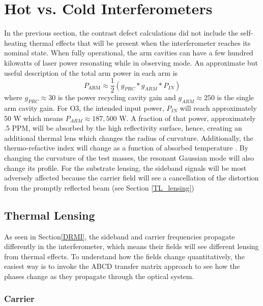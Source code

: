 	\section{Hot vs. Cold Interferometers}\label{sec:hotcoldifo}
		In the previous section, the contrast defect calculations did not include the self-heating thermal effects that will be present when the interferometer reaches its nominal state.
		When fully operational, the arm cavities can have a few hundred kilowatts of laser power resonating while in observing mode. 
		An approximate but useful description of the total arm power in each arm is
	\begin{equation}
		P_{\text{ARM}} \approx \frac{1}{2} (g_{PRC} * g_{ARM} * P_{IN})
	\end{equation}
	where $g_{PRC} \approx 30$ is the power recycling cavity gain and $g_{ARM} \approx 250$ is the single arm cavity gain.
		For O3, the intended input power, $P_{IN}$ will reach approximately 50 W which means $P_{ARM} \approx 187,500$ W. 
		A fraction of that power, approximately .5 PPM, will be absorbed by the high reflectivity surface, hence, creating an additional thermal lens which changes the radius of curvature.  
		Additionally, the thermo-refactive index will change as a function of absorbed temperature \cite{winkler_thermaldist}.
		By changing the curvature of the test masses, the resonant Gaussian mode will also change its profile.
		For the substrate lensing, the sideband signals will be most adversely affected because the carrier field will see a cancellation of the distortion from the promptly reflected beam (see Section \ref{TL_lensing})
	
	\subsection{Thermal Lensing}\label{Sec:TL_lensing}
	\cite{hiro_thermal_lens}
		As seen in Section\ref{DRMI}, the sideband and carrier frequencies propagate differently in the interferometer, which means their fields will see different lensing from thermal effects.
		To understand how the fields change quantitatively, the easiest way is to invoke the ABCD transfer matrix approach to see how the phases change as they propagate through the optical system.
		\subsubsection{Carrier}
	
